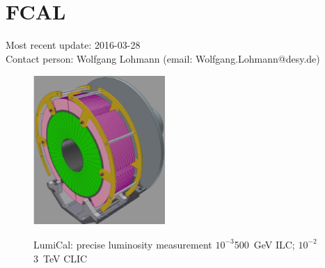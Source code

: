 \section{FCAL}
Most recent update: 2016-03-28 \\
Contact person: Wolfgang Lohmann (email: Wolfgang.Lohmann@desy.de)
\begin{figure}
\begin{minipage}{\linewidth}
    \begin{minipage}{.25\linewidth}
\includegraphics[width=\textwidth]{Calorimeter/FCAL/LumiCalPic.png}
    \end{minipage}
        \begin{minipage}{.24\linewidth}
            LumiCal: precise luminosity measurement $10^{-3}$\@ \SI{500}{GeV} ILC; $10^{-2}$ \@ \SI{3}{TeV} CLIC
        \end{minipage}
    \begin{minipage}{.25\linewidth}

\end{minipage}
\end{minipage}
\end{figure}
